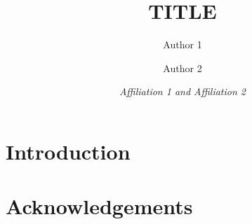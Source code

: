 \documentclass[a4paper,11pt,draft]{article}
\numberwithin{equation}{section}
\theoremstyle{plain}
\theoremstyle{definition}
\begin{document}
\title{\sc\bf\large\MakeUppercase{Title}}
\author{\sc Author 1 \and \sc Author 2}

\date{\itshape Affiliation 1 and Affiliation 2}

\maketitle

\section{Introduction}


\section*{Acknowledgements}

\setlength{\bibsep}{0.5ex}
\def\bibfont{\small}

%
%

\begin{thebibliography}{1}


\end{thebibliography}
\end{document}

